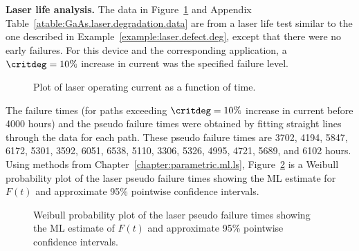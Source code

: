 \begin{example}
{\bf Laser life analysis.}
\label{example:simple.deg.laser}
The data in
Figure~\ref{figure:GaAs.laser.ps} and Appendix
Table~\ref{atable:GaAs.laser.degradation.data} are from a laser life
test similar to the one described in
Example~\ref{example:laser.defect.deg}, except that there were no
early failures.  For this device and the corresponding application,
a $\critdeg=10\%$ increase in current was the specified failure
level.
\begin{figure}
\caption{Plot of laser operating current as a function of time.}
\label{figure:GaAs.laser.ps}
\end{figure}
The failure times (for paths exceeding $\critdeg=10\%$ increase in
current before 4000 hours) and the pseudo failure times were
obtained by fitting straight lines through the data for each
path. These pseudo failure times are 3702, 4194, 5847, 6172, 5301,
3592, 6051, 6538, 5110, 3306, 5326, 4995, 4721, 5689, and 6102
hours.  Using methods from Chapter~\ref{chapter:parametric.ml.ls},
Figure~\ref{figure:GaAs.laser.lognor.mleprobplot.ps} is a Weibull
probability plot of the laser
pseudo failure times showing the ML estimate for $F(t)$ and
approximate 95\% pointwise confidence intervals.
\begin{figure}
\caption{Weibull probability plot of the laser pseudo 
failure times showing the ML estimate of $F(t)$
and approximate 95\% pointwise confidence intervals.}
\label{figure:GaAs.laser.lognor.mleprobplot.ps}
\end{figure}
\end{example}




